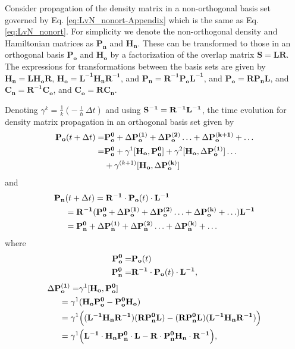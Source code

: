 \documentclass[journal=jctcce,manuscript=article,etalmode=truncate,maxauthors=10,layout=twocolumn,9pt]{achemso}   %
\begin{document}
Consider   propagation of the  density matrix in a non-orthogonal  basis set governed  by Eq. \ref{eq:LvN_nonort-Appendix} which is the same as Eq. \ref{eq:LvN_nonort}.
For simplicity we denote the non-orthogonal   density  and Hamiltonian matrices as $\mathbf{P_n}$ and  $\mathbf{H_n}$.
These  can be transformed to those in   an orthogonal basis $\mathbf{P_o}$ 
and $\mathbf{H_o}$  by a factorization of the overlap matrix $\mathbf{S= LR}$.  The expressions for 
transformations between the basis sets are  given by  
$\mathbf{H_n= L H_o R }$,  
$\mathbf{H_o= L^{-1}  H_n R^{-1}}$, and  $\mathbf{P_n= R^{-1} P_o L^{-1} }$,   and $\mathbf{P_o= R P_n L }$, and
$\mathbf{C_n= R^{-1} C_o }$, and $\mathbf{C_o= R C_n }$.

Denoting   $\gamma^k= \frac{1}{k} ( -\frac{\imath}{\hbar}\Delta t )$ and using 
$\vb{S^{-1}=  R^{-1}  L^{-1}}$, 
the time evolution for   density matrix propagation  in an orthogonal basis  set given by
\begin{align}
\nonumber \mathbf { P_o} (t+\Delta t) =&  \vb{ P_o^0}  +  \Delta \vb{P_o^{(1)}} 
+  \Delta \vb{P_o^{(2)}}   \ldots + \Delta \vb{P_o^{(k+1)}} +\ldots  \\
\nonumber   =&  \mathbf{ P_o^0}  +\gamma^1 [\vb{  H_o, P_o^0}] +   \gamma^2 [\vb{  H_o}, \Delta \vb{P_o^{(1)}}]  \ldots \\
            & + \gamma^{(k+1)}  [\vb{  H_o}, \Delta \vb{P_o^{(k)}}] 
\end{align}
and 
\begin{align}
\nonumber \vb{ P_n} & (t+\Delta t) = \vb{R^{-1} \cdot  P_o} (t) \cdot \vb{ L^{-1} } \\
\nonumber & =\vb{R^{-1}}  (\vb{ P_o^0}  +  \Delta \vb{P_o^{(1)}}  
            +  \Delta \vb{P_o^{(2)}}   \ldots + \Delta \vb{P_o^{(k)}} +\ldots   )  \vb{ L^{-1} } \\
  & =  \vb{ P_n^0}  +  \Delta \vb{P_n^{(1)}} +  \Delta \vb{P_n^{(2)}}   \ldots + \Delta \vb{P_n^{(k)}} +\ldots 
\end{align}
where
\begin{align*}
\vb{ P_o^0} = &\vb{ P_o}(t) \\
\vb{ P_n^0} = & \vb{R^{-1}} \cdot \vb{ P_o}(t) \cdot \vb{ L^{-1} }, 
\end{align*}
\begin{align*}
\Delta \vb{ P_o^{(1)}} = & \gamma^1  \vb{[H_o, P_o^0 ] } \\
                =  \gamma^1 & ( \vb{H_o P_o^0 - P_o^0 H_o  } ) \\
                =  \gamma^1 & \Big(\vb{ (L^{-1} H_n R^{-1})( R  P_n^0 L)} - \vb{(R P_n^0 L)(L^{-1} H_n R^{-1}) }\Big)\\
                =  \gamma^1 & \Big( \vb{ L^{-1} \cdot   H_n P_n^0  \cdot  L } -  \vb{ R \cdot  P_n^0 H_n\cdot R^{-1} }\Big),
\end{align*}
\end{document}
